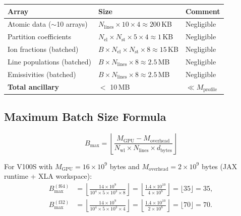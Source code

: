\documentclass[11pt]{article}
\begin{document}
\begin{center}
\begin{tabular}{lll}
\toprule
\textbf{Array} & \textbf{Size} & \textbf{Comment} \\
\midrule
Atomic data ($\sim$10 arrays)
  & $N_\mathrm{lines} \times 10 \times 4 \approx 200$\,KB & Negligible \\
Partition coefficients
  & $N_\mathrm{el} \times N_\mathrm{st} \times 5 \times 4 \approx 1$\,KB & Negligible \\
Ion fractions (batched)
  & $B \times N_\mathrm{el} \times N_\mathrm{st} \times 8 \approx 15$\,KB & Negligible \\
Line populations (batched)
  & $B \times N_\mathrm{lines} \times 8 \approx 2.5$\,MB & Negligible \\
Emissivities (batched)
  & $B \times N_\mathrm{lines} \times 8 \approx 2.5$\,MB & Negligible \\
\midrule
\textbf{Total ancillary}
  & $<$ 10\,MB & $\ll M_\mathrm{profile}$ \\
\bottomrule
\end{tabular}
\end{center}

\subsection{Maximum Batch Size Formula}
\label{sec:max-batch}

\begin{equation}
  \label{eq:max-batch}
  \boxed{B_\mathrm{max} = \left\lfloor
    \frac{M_\mathrm{GPU} - M_\mathrm{overhead}}{N_\mathrm{wl} \times N_\mathrm{lines} \times d_\mathrm{bytes}}
  \right\rfloor}
\end{equation}

For V100S with $M_\mathrm{GPU} = 16 \times 10^9$ bytes and
$M_\mathrm{overhead} = 2 \times 10^9$ bytes (JAX runtime + XLA workspace):
\begin{align}
  B_\mathrm{max}^\mathrm{(f64)} &= \left\lfloor \frac{14 \times 10^9}{10^4 \times 5 \times 10^3 \times 8} \right\rfloor
    = \left\lfloor \frac{1.4 \times 10^{10}}{4 \times 10^8} \right\rfloor
    = \lfloor 35 \rfloor = 35, \label{eq:Bmax-f64}\\
  B_\mathrm{max}^\mathrm{(f32)} &= \left\lfloor \frac{14 \times 10^9}{10^4 \times 5 \times 10^3 \times 4} \right\rfloor
    = \left\lfloor \frac{1.4 \times 10^{10}}{2 \times 10^8} \right\rfloor
    = \lfloor 70 \rfloor = 70. \label{eq:Bmax-f32}
\end{align}
\end{document}
